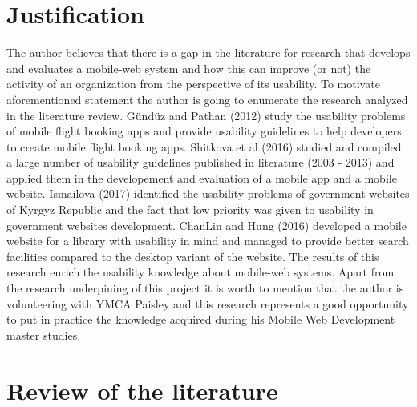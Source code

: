 \documentclass[version=last,fontsize=13pt]{scrartcl}
\begin{document}
\section{Justification} %
	\indent
	The author believes that there is a gap in the literature for  research that develops  and evaluates a mobile-web system and how this can improve (or not) the activity of an organization from the perspective of its usability. To motivate aforementioned statement the author is going to enumerate the research analyzed in the literature review. Gündüz and Pathan (2012) study the usability problems of mobile flight booking apps and provide usability guidelines to help developers to create mobile flight booking apps. Shitkova et al (2016) studied and compiled a large number of usability guidelines published in literature (2003 - 2013) and applied them in the developement and evaluation of a mobile app and a mobile website. Ismailova (2017) identified the usability problems of government websites of Kyrgyz Republic and the fact that low priority was given to usability in government websites development. ChanLin and Hung (2016) developed a mobile website for a library with usability in mind and managed to provide better search facilities compared to the desktop variant of the website. The results of this research enrich the usability knowledge about mobile-web systems. Apart from the research underpining of this project it is worth to mention that the author is volunteering with YMCA Paisley and this research represents a good opportunity to put in practice the knowledge acquired during his Mobile Web Development master studies.\\



\section{Review of the literature } %

\end{document}
